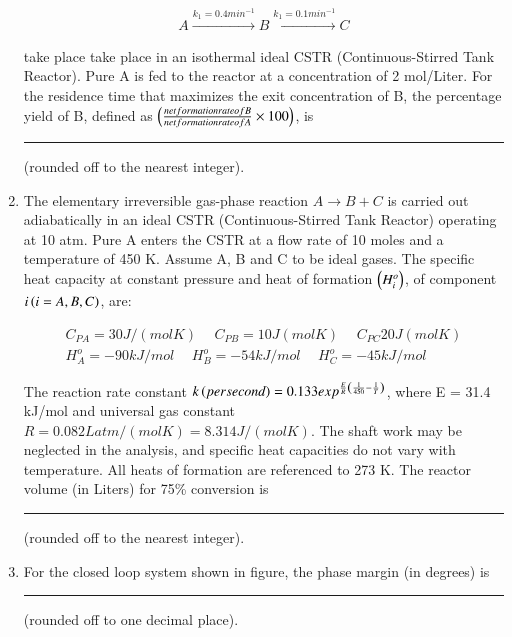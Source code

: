 \documentclass[journal,12pt,onecolumn]{IEEEtran}
\theoremstyle{remark}
\begin{document}
\begin{enumerate}
\begin{align*}
     A \xrightarrow{{k_1 = 0.4 min^{-1}}} B \xrightarrow{{k_1 = 0.1 min^{-1}}} C
\end{align*}

    take place take place in an isothermal ideal CSTR (Continuous-Stirred Tank Reactor). Pure A is fed to the reactor at a concentration of 2 mol/Liter. For the residence time that maximizes the exit concentration of B, the percentage yield of B, defined as $\left(\frac{net formation rate of B}{net formation rate of A} \times 100\right)$, is \rule{1.5cm}{0.1mm}(rounded off to the nearest integer).
    
\hfill{}

    \item The elementary irreversible gas-phase reaction $A \to B + C$ is carried out adiabatically in an ideal CSTR (Continuous-Stirred Tank Reactor) operating at 10 atm. Pure A enters the CSTR at a flow rate of 10 moles and a temperature of 450 K. Assume A, B and C to be ideal gases. The specific heat capacity at constant pressure   and heat of formation $\left(H^{o}_{i}\right)$, of component $i \left(i = A, B, C\right)$, are: 

    \begin{align*}
        C_{PA} = 30J/(mol K) \hspace{15pt} C_{PB} = 10J(mol K) \hspace{15pt} C_{PC} 20J(mol K) \\ 
        H^{o}_{A} = -90 kJ/mol \hspace{15pt} H^{o}_{B} = -54 kJ/mol \hspace{15pt} H^{o}_{C} = -45 kJ/mol 
    \end{align*}

    The reaction rate constant $k \left(per second\right) = 0.133 exp^{\frac{E}{R}\left(\frac{1}{450} - \frac{1}{T}\right)}$, where E = 31.4 kJ/mol and universal gas constant $R = 0.082 L atm/(mol K) = 8.314 J/(mol K)$. The shaft work may be neglected in the analysis, and specific heat capacities do not vary with temperature. All heats of formation are referenced to 273 K. The reactor volume (in Liters) for 75\% conversion is \rule{1.5cm}{0.1mm}(rounded off to the nearest integer). 
    
\hfill{}
\newpage
    \item For the closed loop system shown in figure, the phase margin (in degrees) is \rule{2cm}{0.1mm}(rounded off to one decimal place). 
    

\end{enumerate}
\end{document}
